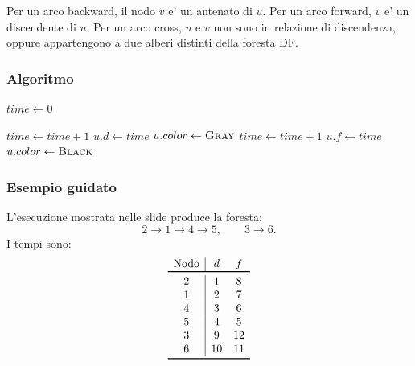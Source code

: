 Per un arco backward, il nodo $v$ e' un antenato di $u$. Per un arco forward, $v$ e' un discendente di $u$. Per un arco cross, $u$ e $v$ non sono in relazione di discendenza, oppure appartengono a due alberi distinti della foresta DF.

\subsubsection{Algoritmo}
\begin{algorithm}[H]
	\caption{\textsc{DFS}$(G)$}
	$time\gets 0$
\end{algorithm}

\begin{algorithm}[H]
	\caption{\textsc{DFS-Visit}$(G,u)$}
	$time\gets time+1$\;
	$u.d\gets time$\;
	$u.color\gets\textsc{Gray}$\;
	$time\gets time+1$\;
	$u.f\gets time$\;
	$u.color\gets\textsc{Black}$\;
\end{algorithm}

\subsubsection{Esempio guidato}
L'esecuzione mostrata nelle slide produce la foresta:
\[
2\to 1\to 4\to 5,
\qquad
3\to 6.
\]
I tempi sono:
\[
\begin{array}{c|cc}
\text{Nodo} & d & f \\
\toprule
2 & 1 & 8 \\
1 & 2 & 7 \\
4 & 3 & 6 \\
5 & 4 & 5 \\
3 & 9 & 12 \\
6 & 10 & 11 \\
\bottomrule
\end{array}
\]

